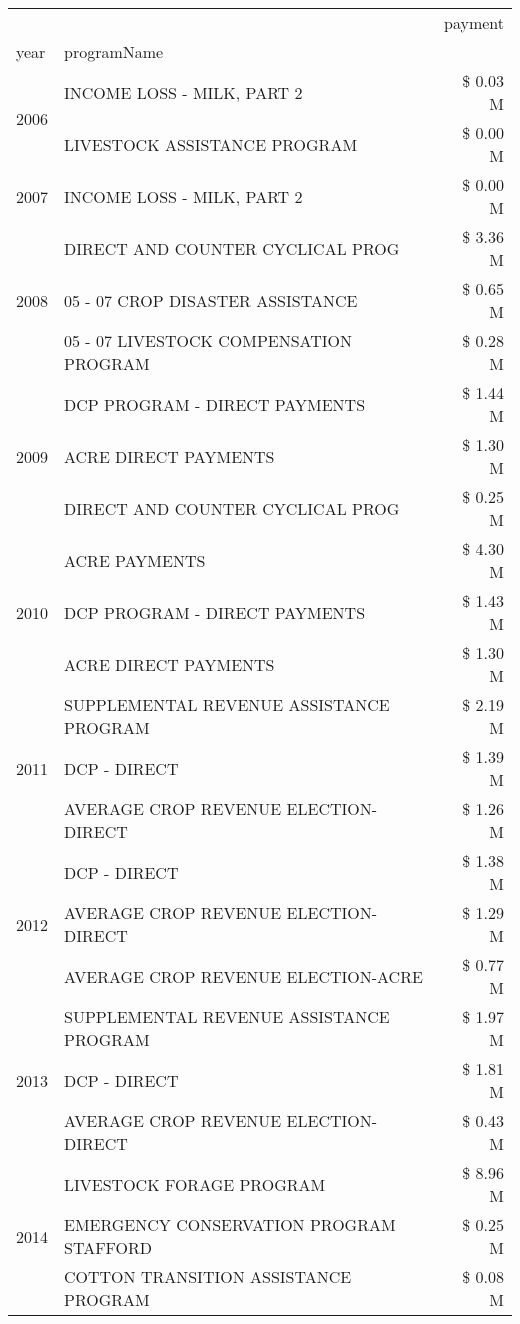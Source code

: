 \begin{tabular}{llr}
\toprule
 &  & payment \\
year & programName &  \\
\midrule
\multirow[t]{2}{*}{2006} & INCOME LOSS - MILK, PART 2 & \$ 0.03 M \\
 & LIVESTOCK ASSISTANCE PROGRAM & \$ 0.00 M \\
\cline{1-3}
2007 & INCOME LOSS - MILK, PART 2 & \$ 0.00 M \\
\cline{1-3}
\multirow[t]{3}{*}{2008} & DIRECT AND COUNTER CYCLICAL PROG & \$ 3.36 M \\
 & 05 - 07 CROP DISASTER ASSISTANCE & \$ 0.65 M \\
 & 05 - 07 LIVESTOCK COMPENSATION PROGRAM & \$ 0.28 M \\
\cline{1-3}
\multirow[t]{3}{*}{2009} & DCP PROGRAM - DIRECT PAYMENTS & \$ 1.44 M \\
 & ACRE DIRECT PAYMENTS & \$ 1.30 M \\
 & DIRECT AND COUNTER CYCLICAL PROG & \$ 0.25 M \\
\cline{1-3}
\multirow[t]{3}{*}{2010} & ACRE PAYMENTS & \$ 4.30 M \\
 & DCP PROGRAM - DIRECT PAYMENTS & \$ 1.43 M \\
 & ACRE DIRECT PAYMENTS & \$ 1.30 M \\
\cline{1-3}
\multirow[t]{3}{*}{2011} & SUPPLEMENTAL REVENUE ASSISTANCE PROGRAM & \$ 2.19 M \\
 & DCP - DIRECT & \$ 1.39 M \\
 & AVERAGE CROP REVENUE ELECTION-DIRECT & \$ 1.26 M \\
\cline{1-3}
\multirow[t]{3}{*}{2012} & DCP - DIRECT & \$ 1.38 M \\
 & AVERAGE CROP REVENUE ELECTION-DIRECT & \$ 1.29 M \\
 & AVERAGE CROP REVENUE ELECTION-ACRE & \$ 0.77 M \\
\cline{1-3}
\multirow[t]{3}{*}{2013} & SUPPLEMENTAL REVENUE ASSISTANCE PROGRAM & \$ 1.97 M \\
 & DCP - DIRECT & \$ 1.81 M \\
 & AVERAGE CROP REVENUE ELECTION-DIRECT & \$ 0.43 M \\
\cline{1-3}
\multirow[t]{3}{*}{2014} & LIVESTOCK FORAGE PROGRAM & \$ 8.96 M \\
 & EMERGENCY CONSERVATION PROGRAM STAFFORD & \$ 0.25 M \\
 & COTTON TRANSITION ASSISTANCE PROGRAM & \$ 0.08 M \\
\cline{1-3}

\end{tabular}
